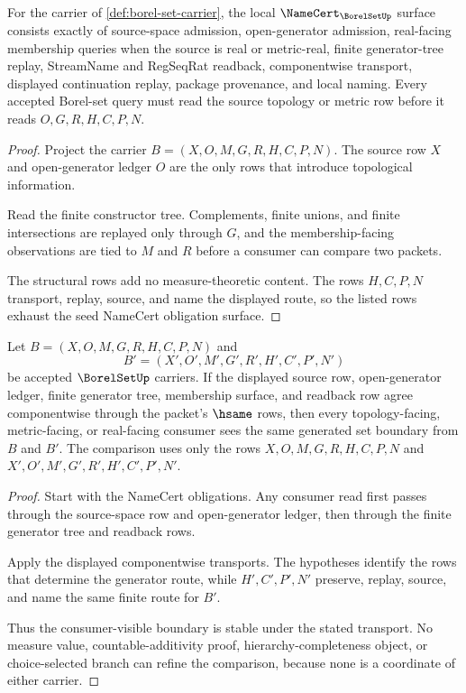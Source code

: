 \begin{theorem}
\label{thm:borel-set-namecert-obligations}
For the carrier of \autoref{def:borel-set-carrier}, the local $\NameCert_{\BorelSetUp}$ surface consists exactly of source-space admission, open-generator admission, real-facing membership queries when the source is real or metric-real, finite generator-tree replay, StreamName and RegSeqRat readback, componentwise transport, displayed continuation replay, package provenance, and local naming. Every accepted Borel-set query must read the source topology or metric row before it reads $O,G,R,H,C,P,N$.
\end{theorem}
\begin{proof}
Project the carrier $B=(X,O,M,G,R,H,C,P,N)$. The source row $X$ and open-generator ledger $O$ are the only rows that introduce topological information.

Read the finite constructor tree. Complements, finite unions, and finite intersections are replayed only through $G$, and the membership-facing observations are tied to $M$ and $R$ before a consumer can compare two packets.

The structural rows add no measure-theoretic content. The rows $H,C,P,N$ transport, replay, source, and name the displayed route, so the listed rows exhaust the seed NameCert obligation surface.
\end{proof}

\begin{theorem}
\label{thm:borel-set-generator-stability}
Let $B=(X,O,M,G,R,H,C,P,N)$ and
$$
B'=(X',O',M',G',R',H',C',P',N')
$$
be accepted $\BorelSetUp$ carriers. If the displayed source row, open-generator ledger, finite generator tree, membership surface, and readback row agree componentwise through the packet's $\hsame$ rows, then every topology-facing, metric-facing, or real-facing consumer sees the same generated set boundary from $B$ and $B'$. The comparison uses only the rows $X,O,M,G,R,H,C,P,N$ and $X',O',M',G',R',H',C',P',N'$.
\end{theorem}
\begin{proof}
Start with the NameCert obligations. Any consumer read first passes through the source-space row and open-generator ledger, then through the finite generator tree and readback rows.

Apply the displayed componentwise transports. The hypotheses identify the rows that determine the generator route, while $H',C',P',N'$ preserve, replay, source, and name the same finite route for $B'$.

Thus the consumer-visible boundary is stable under the stated transport. No measure value, countable-additivity proof, hierarchy-completeness object, or choice-selected branch can refine the comparison, because none is a coordinate of either carrier.
\end{proof}

